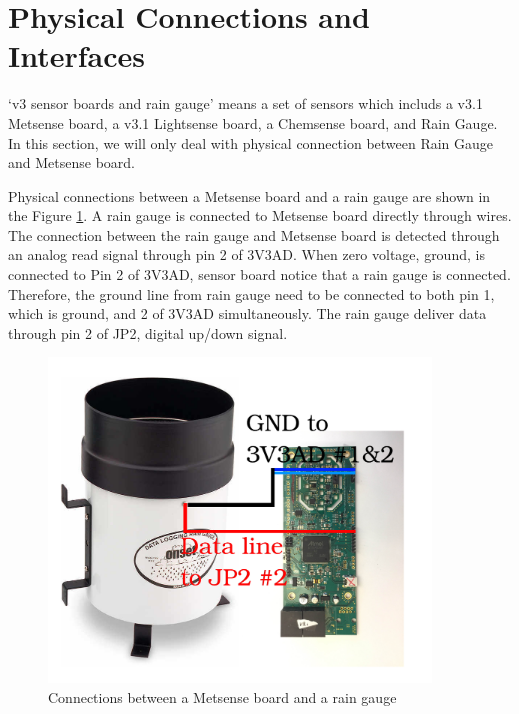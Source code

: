 \section{Physical Connections and Interfaces}

`v3 sensor boards and rain gauge' means a set of sensors which includs a v3.1 Metsense board, a v3.1 Lightsense board, a Chemsense board, and Rain Gauge.
In this section, we will only deal with physical connection between Rain Gauge and Metsense board.
\par

Physical connections between a Metsense board and a rain gauge are shown in the Figure \ref{fig:connect}. A rain gauge is connected to Metsense board directly through wires. The connection between the rain gauge and Metsense board is detected through an analog read signal through pin 2 of 3V3AD. When zero voltage, ground, is connected to Pin 2 of 3V3AD, sensor board notice that a rain gauge is connected. Therefore, the ground line from rain gauge need to be connected to both pin 1, which is ground, and 2 of 3V3AD simultaneously. The rain gauge deliver data through pin 2 of JP2, digital up/down signal.



\begin{figure}[h]
\begin{center}
\includegraphics[width=4in]{con.png}
\caption{Connections between a Metsense board and a rain gauge}
\label{fig:connect}
\end{center}
\end{figure}

